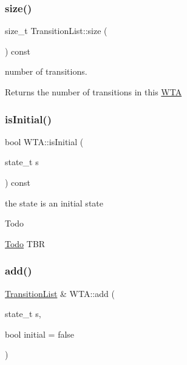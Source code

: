 \subsubsection{\texorpdfstring{size()}{size()}}
{\footnotesize\ttfamily size\+\_\+t Transition\+List\+::size (\begin{DoxyParamCaption}{ }\end{DoxyParamCaption}) const}



number of transitions. 

\begin{DoxyReturn}{Returns}
the number of transitions in this \mbox{\hyperlink{classWTA}{W\+TA}} 
\end{DoxyReturn}
\mbox{\label{group__schemata_ga88d07a1e47cc3ee537234861b7336dd6}} 
\subsubsection{\texorpdfstring{isInitial()}{isInitial()}}
{\footnotesize\ttfamily bool W\+T\+A\+::is\+Initial (\begin{DoxyParamCaption}\item[{state\+\_\+t}]{s }\end{DoxyParamCaption}) const}



the state is an initial state 

\begin{DoxyRefDesc}{Todo}
\item[\mbox{\hyperlink{todo__todo000017}{Todo}}]T\+BR \end{DoxyRefDesc}
\mbox{\label{group__schemata_ga924a1c533383a7185b9d466b59c5a495}} 
\subsubsection{\texorpdfstring{add()}{add()}\hspace{0.1cm}{\footnotesize\ttfamily [2/3]}}
{\footnotesize\ttfamily \mbox{\hyperlink{classTransitionList}{Transition\+List}} \& W\+T\+A\+::add (\begin{DoxyParamCaption}\item[{state\+\_\+t}]{s,  }\item[{bool}]{initial = {\ttfamily false} }\end{DoxyParamCaption})}




